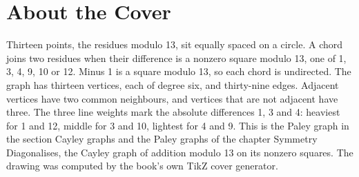 \backmatter
\cleardoublepage
\chapter*{About the Cover}
\noindent Thirteen points, the residues modulo 13, sit equally spaced on a circle. A chord joins two residues when their difference is a nonzero square modulo 13, one of 1, 3, 4, 9, 10 or 12. Minus 1 is a square modulo 13, so each chord is undirected. The graph has thirteen vertices, each of degree six, and thirty-nine edges. Adjacent vertices have two common neighbours, and vertices that are not adjacent have three. The three line weights mark the absolute differences 1, 3 and 4: heaviest for 1 and 12, middle for 3 and 10, lightest for 4 and 9. This is the Paley graph in the section Cayley graphs and the Paley graphs of the chapter Symmetry Diagonalises, the Cayley graph of addition modulo 13 on its nonzero squares. The drawing was computed by the book's own TikZ cover generator.

